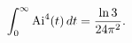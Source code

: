 \[\int_{0}^{\infty}{\mathop{\mathrm{Ai}\/}\nolimits^{4}}\!\left(t\right)dt=\frac%
{\mathop{\ln\/}\nolimits 3}{24\pi^{2}}.\]